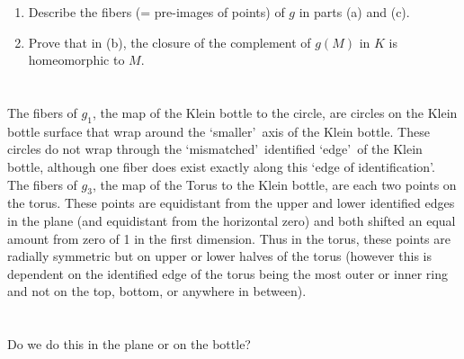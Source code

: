 \documentclass{jhwhw}
\begin{document}
\problem{}%
\begin{enumerate}
	\item Describe the fibers (= pre-images of points) of $g$  in parts (a) and (c).
	\item Prove that in (b),  the closure of the complement of $g(M)$ in $K$  is homeomorphic to $M$.
	
\end{enumerate}
\solution{}
\part{}%
\noindent
The fibers of $g_1$, the map of the Klein bottle to the circle, are circles on the Klein bottle surface that wrap around the \lq smaller\rq\ axis of the Klein bottle. These circles do not wrap through the \lq mismatched\rq\ identified \lq edge\rq\ of the Klein bottle, although one fiber does exist exactly along this \lq edge of identification\rq.
\\

\noindent
The fibers of $g_3$, the map of the Torus to the Klein bottle, are each two points on the torus. These points are equidistant from the upper and lower identified edges in the plane (and equidistant from the horizontal zero) and both shifted an equal amount from zero of 1 in the first dimension. Thus in the torus, these points are radially symmetric but on upper or lower halves of the torus (however this is dependent on the identified edge of the torus being the most outer or inner ring and not on the top, bottom, or anywhere in between).
\part{}%
\noindent
Do we do this in the plane or on the bottle?
\end{document}
